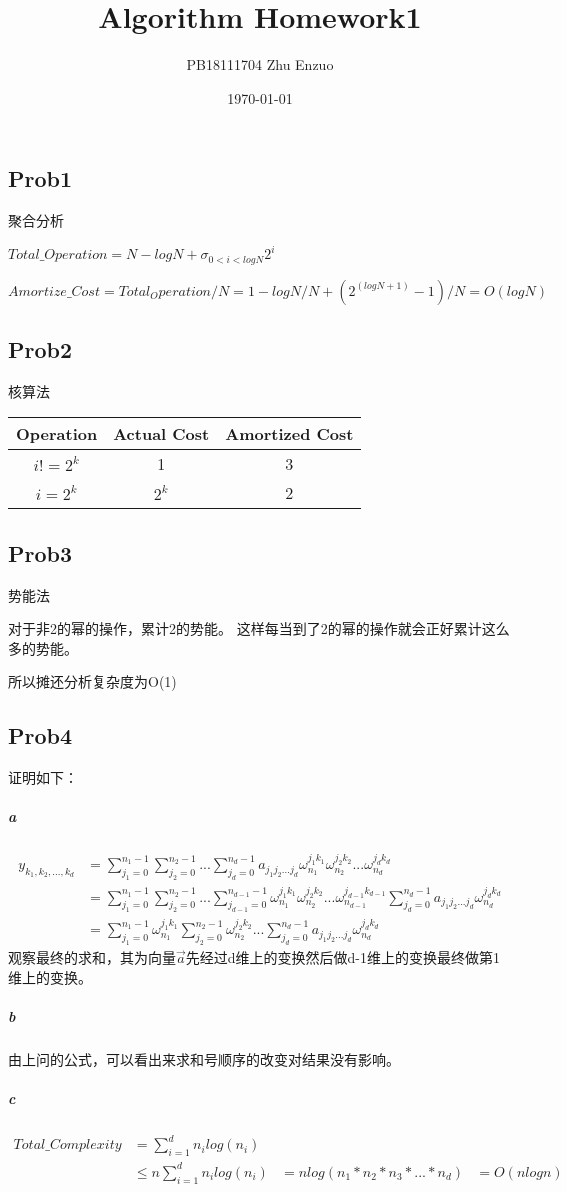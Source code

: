 \documentclass{ctexart}
\title{Algorithm Homework1}
\author{PB18111704 Zhu Enzuo}
\date{\today}
\begin{document}
\maketitle
\subsection{Prob1} 聚合分析

$Total\_Operation=N-logN+\sigma_{0<i<logN} 2^i$

$Amortize\_Cost=Total_Operation/N=1-logN/N+(2^{(logN+1)}-1)/N=O(logN)$
\subsection{Prob2} 核算法

\begin{tabular}{|c|c|c|}
\hline
Operation & Actual Cost & Amortized Cost \\
\hline
$i!=2^k$ & 1 & 3 \\
\hline
$i=2^k$ & $2^k$ & 2 \\
\hline 
\end{tabular}

\subsection{Prob3} 势能法 

对于非2的幂的操作，累计2的势能。
这样每当到了2的幂的操作就会正好累计这么多的势能。

所以摊还分析复杂度为O(1)
\subsection{Prob4} 证明如下：

\subparagraph{a}
\[\begin{aligned}
    y_{k_1,k_2,...,k_d} &= \sum_{j_1=0}^{n_1-1}\sum_{j_2=0}^{n_2-1}...\sum_{j_d=0}^{n_d-1} a_{j_1j_2...j_d}
    \omega_{n_1}^{j_1k_1} \omega_{n_2}^{j_2k_2}...\omega_{n_d}^{j_dk_d} \\
    &=\sum_{j_1=0}^{n_1-1}\sum_{j_2=0}^{n_2-1}...\sum_{j_{d-1}=0}^{n_{d-1}-1} \omega_{n_1}^{j_1k_1}
    \omega_{n_2}^{j_2k_2}...\omega_{n_{d-1}}^{j_{d-1}k_{d-1}} \sum_{j_d=0}^{n_d-1} a_{j_1j_2...j_d}\omega_{n_d}^{j_dk_d}\\
    &=\sum_{j_1=0}^{n_1-1}\omega_{n_1}^{j_1k_1}\sum_{j_2=0}^{n_2-1}
    \omega_{n_2}^{j_2k_2}...\sum_{j_d=0}^{n_d-1} a_{j_1j_2...j_d}\omega_{n_d}^{j_dk_d}
\end{aligned}\]
观察最终的求和，其为向量$\vec{a}$先经过d维上的变换然后做d-1维上的变换最终做第1维上的变换。
\subparagraph{b}
由上问的公式，可以看出来求和号顺序的改变对结果没有影响。
\subparagraph{c}
\[\begin{aligned}
Total\_Complexity&=\sum_{i=1}^d n_ilog(n_i) \\
                 &\le n\sum_{i=1}^d n_ilog(n_i)
                 &=nlog(n_1*n_2*n_3*...*n_d)
                 &=O(nlogn)
\end{aligned}\]
\end{document}
